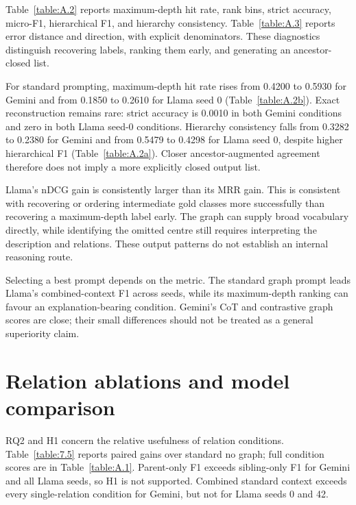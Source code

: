 Table~\ref{table:A.2} reports maximum-depth hit rate, rank bins, strict accuracy, micro-F1, hierarchical F1, and hierarchy consistency. Table~\ref{table:A.3} reports error distance and direction, with explicit denominators. These diagnostics distinguish recovering labels, ranking them early, and generating an ancestor-closed list.


For standard prompting, maximum-depth hit rate rises from 0.4200 to 0.5930 for Gemini and from 0.1850 to 0.2610 for Llama seed 0 (Table~\ref{table:A.2b}). Exact reconstruction remains rare: strict accuracy is 0.0010 in both Gemini conditions and zero in both Llama seed-0 conditions. Hierarchy consistency falls from 0.3282 to 0.2380 for Gemini and from 0.5479 to 0.4298 for Llama seed 0, despite higher hierarchical F1 (Table~\ref{table:A.2a}). Closer ancestor-augmented agreement therefore does not imply a more explicitly closed output list.


Llama’s nDCG gain is consistently larger than its MRR gain. This is consistent with recovering or ordering intermediate gold classes more successfully than recovering a maximum-depth label early. The graph can supply broad vocabulary directly, while identifying the omitted centre still requires interpreting the description and relations. These output patterns do not establish an internal reasoning route.


Selecting a best prompt depends on the metric. The standard graph prompt leads Llama’s combined-context F1 across seeds, while its maximum-depth ranking can favour an explanation-bearing condition. Gemini’s CoT and contrastive graph scores are close; their small differences should not be treated as a general superiority claim.


\FloatBarrier

\section{Relation ablations and model comparison}

RQ2 and H1 concern the relative usefulness of relation conditions. Table~\ref{table:7.5} reports paired gains over standard no graph; full condition scores are in Table~\ref{table:A.1}. Parent-only F1 exceeds sibling-only F1 for Gemini and all Llama seeds, so H1 is not supported. Combined standard context exceeds every single-relation condition for Gemini, but not for Llama seeds 0 and 42.


